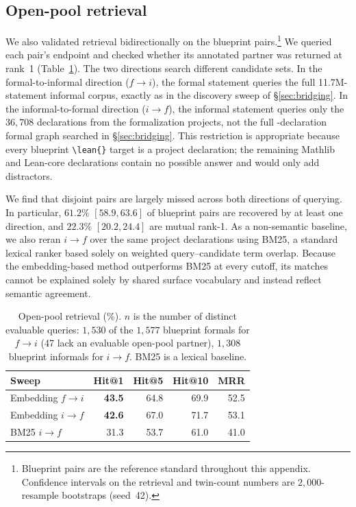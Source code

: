 \subsection{Open-pool retrieval}
We also validated retrieval bidirectionally on the blueprint pairs.\footnote{Blueprint pairs are the reference standard throughout this appendix. Confidence intervals on the retrieval and twin-count numbers are $2{,}000$-resample bootstraps (seed~42).} We queried each pair's endpoint and checked whether its annotated partner was returned at rank~1 (Table~\ref{tab:bp-retrieval}). The two directions search different candidate sets. In the formal-to-informal direction ($f\to i$), the formal statement queries the full 11.7M-statement informal corpus, exactly as in the discovery sweep of \S\ref{sec:bridging}. In the informal-to-formal direction ($i\to f$), the informal statement queries only the $36{,}708$ declarations from the formalization projects, not the full \nSwept-declaration formal graph searched in \S\ref{sec:bridging}. This restriction is appropriate because every blueprint \texttt{\textbackslash lean\{\}} target is a project declaration; the remaining Mathlib and Lean-core declarations contain no possible answer and would only add distractors.

We find that disjoint pairs are largely missed across both directions of querying. In particular, $61.2\%$ $[58.9, 63.6]$ of blueprint pairs are recovered by at least one direction, and $22.3\%$ $[20.2, 24.4]$ are mutual rank-1. As a non-semantic baseline, we also reran $i\to f$ over the same project declarations using BM25, a standard lexical ranker based solely on weighted query--candidate term overlap. Because the embedding-based method outperforms BM25 at every cutoff, its matches cannot be explained solely by shared surface vocabulary and instead reflect semantic agreement.

\begin{table}[htbp]
  \centering \small \setlength{\tabcolsep}{5pt}
  \begin{tabular}{lrrrr}
    \toprule
    Sweep & Hit@1 & Hit@5 & Hit@10 & MRR \\
    \midrule
    Embedding $f\to i$  & \textbf{43.5} & 64.8 & 69.9 & 52.5 \\
    Embedding $i\to f$  & \textbf{42.6} & 67.0 & 71.7 & 53.1 \\
    BM25 $i\to f$       & 31.3          & 53.7 & 61.0 & 41.0 \\
    \bottomrule
  \end{tabular}
  \caption{Open-pool retrieval (\%). $n$ is the number of distinct evaluable queries: $1{,}530$ of the $1{,}577$ blueprint formals for $f\to i$ (47 lack an evaluable open-pool partner), $1{,}308$ blueprint informals for $i\to f$. BM25 is a lexical baseline.}
  \label{tab:bp-retrieval}
\end{table}

